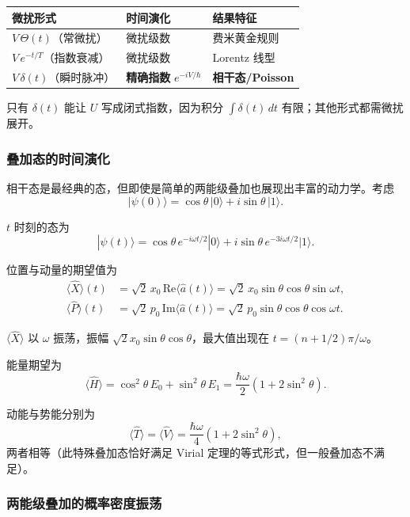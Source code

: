 \begin{tipbox}
\begin{center}
\renewcommand{\arraystretch}{1.3}
\begin{tabular}{lll}
\toprule
\textbf{微扰形式} & \textbf{时间演化} & \textbf{结果特征} \\
\midrule
$V\,\Theta(t)$（常微扰） & 微扰级数 & 费米黄金规则 \\
$V\,e^{-t/T}$（指数衰减） & 微扰级数 & Lorentz 线型 \\
$V\,\delta(t)$（瞬时脉冲） & \textbf{精确指数} $e^{-iV/\hbar}$ & \textbf{相干态/Poisson} \\
\bottomrule
\end{tabular}
\end{center}
只有 $\delta(t)$ 能让 $U$ 写成闭式指数，因为积分 $\int\delta(t)\,dt$ 有限；其他形式都需微扰展开。
\end{tipbox}

\subsubsection{叠加态的时间演化}

相干态是最经典的态，但即使是简单的两能级叠加也展现出丰富的动力学。考虑
\[
|\psi(0)\rangle = \cos\theta\,|0\rangle + i\sin\theta\,|1\rangle.
\]

$t$ 时刻的态为
\[
|\psi(t)\rangle = \cos\theta\,e^{-i\omega t/2}|0\rangle + i\sin\theta\,e^{-3i\omega t/2}|1\rangle.
\]

位置与动量的期望值为
\begin{align*}
\langle\hat{X}\rangle(t)
&= \sqrt{2}\,x_0\,\text{Re}\bigl\langle\hat{a}(t)\bigr\rangle
= \sqrt{2}\,x_0\sin\theta\cos\theta\sin\omega t, \\
\langle\hat{P}\rangle(t)
&= \sqrt{2}\,p_0\,\text{Im}\bigl\langle\hat{a}(t)\bigr\rangle
= \sqrt{2}\,p_0\sin\theta\cos\theta\cos\omega t.
\end{align*}

$\langle\hat{X}\rangle$ 以 $\omega$ 振荡，振幅 $\sqrt{2}x_0\sin\theta\cos\theta$，最大值出现在 $t=(n+1/2)\pi/\omega$。

能量期望为
\[
\langle\hat{H}\rangle = \cos^2\theta\,E_0 + \sin^2\theta\,E_1
= \frac{\hbar\omega}{2}(1 + 2\sin^2\theta).
\]

动能与势能分别为
\[
\langle\hat{T}\rangle = \langle\hat{V}\rangle = \frac{\hbar\omega}{4}(1 + 2\sin^2\theta),
\]
两者相等（此特殊叠加态恰好满足 Virial 定理的等式形式，但一般叠加态不满足）。

\subsubsection{两能级叠加的概率密度振荡}

